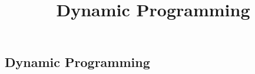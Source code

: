 

\subsection{Dynamic Programming} \title{Dynamic Programming} \author{} \date{}
\begin{frame}[plain,c]
    \titlepage
\end{frame}